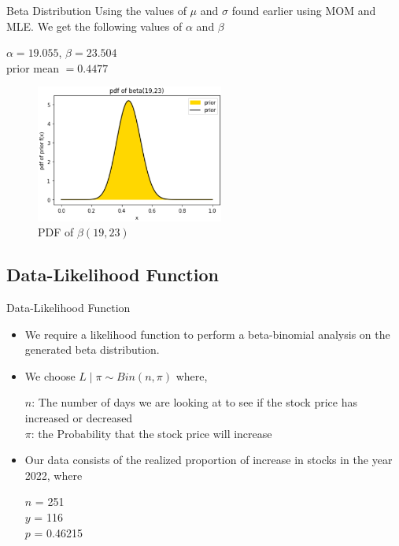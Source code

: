 \documentclass{beamer}
\begin{document}
\begin{frame}{Beta Distribution}
Using the values of $\mu$ and $\sigma$ found earlier using MOM and MLE. We get the following values of $\alpha$ and $\beta$
\begin{center}
    $\alpha = 19.055$,   
    $\beta = 23.504$\\
    prior mean $= 0.4477$
\end{center}  
\begin{figure}[htp]
\includegraphics[width=0.55\textwidth]{Images/Pdf_beta_prior.png}
\caption{PDF of $\beta(19,23)$}
\end{figure}
\end{frame}
\begin{frame}
\section{Data-Likelihood Function}
\end{frame}
\begin{frame}{Data-Likelihood Function}
\begin{itemize}
    \item We require a likelihood function to perform a beta-binomial analysis on the generated beta distribution. 
    \item We choose $L \mid \pi \sim Bin(n,\pi)$ where,
    \begin{center}
    \begin{small}
    $n$: The number of days we are looking at to see if the stock price has increased or decreased \\
    $\pi$: the Probability that the stock price will increase
    \end{small}
    \end{center}
    \item Our data consists of the realized proportion of increase in stocks in the year 2022, where
    \begin{center}
    \begin{small}
    $n$ = 251 \\
    $y$ = 116\\
    $p$ = 0.46215
    \end{small}
    \end{center}
\end{itemize}
\end{frame}
\end{document}
